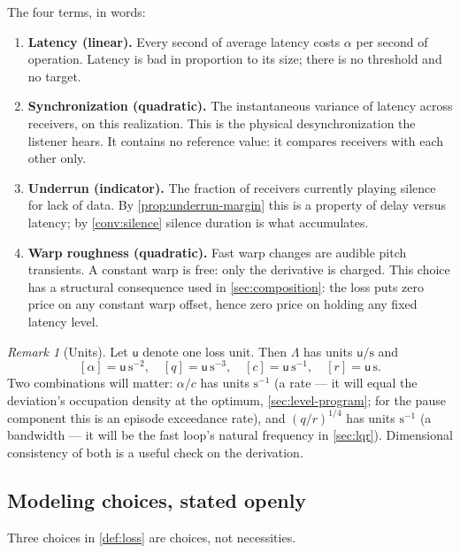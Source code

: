 \documentclass[11pt, a4paper]{article}
\theoremstyle{definition}
\theoremstyle{plain}
\theoremstyle{remark}
\newtheorem{remark}{Remark}[section]
\begin{document}
The four terms, in words:
\begin{enumerate}[label=(\roman*)]
  \item \textbf{Latency (linear).}  Every second of average latency costs
    $\alpha$ per second of operation.  Latency is bad in proportion to its
    size; there is no threshold and no target.
  \item \textbf{Synchronization (quadratic).}  The instantaneous variance
    of latency across receivers, on this realization.  This is the
    physical desynchronization the listener hears.  It contains no
    reference value: it compares receivers with each other only.
  \item \textbf{Underrun (indicator).}  The fraction of receivers
    currently playing silence for lack of data.  By
    \cref{prop:underrun-margin} this is a property of delay versus
    latency; by \cref{conv:silence} silence duration is what accumulates.
  \item \textbf{Warp roughness (quadratic).}  Fast warp changes are
    audible pitch transients.  A constant warp is free: only the
    derivative is charged.  This choice has a structural consequence used
    in \cref{sec:composition}: the loss puts zero price on any constant
    warp offset, hence zero price on holding any fixed latency level.
\end{enumerate}

\begin{remark}[Units]\label{rem:units}
Let $\mathsf{u}$ denote one loss unit.  Then $\Lambda$ has units
$\mathsf{u}/\mathrm{s}$ and
\[
  [\alpha] = \mathsf{u}\,\mathrm{s}^{-2},\quad
  [q] = \mathsf{u}\,\mathrm{s}^{-3},\quad
  [c] = \mathsf{u}\,\mathrm{s}^{-1},\quad
  [r] = \mathsf{u}\,\mathrm{s}.
\]
Two combinations will matter:
$\alpha/c$ has units $\mathrm{s}^{-1}$ (a rate --- it will equal the
deviation's occupation density at the optimum,
\cref{sec:level-program}; for the pause component this is an episode
exceedance rate), and $(q/r)^{1/4}$ has units
$\mathrm{s}^{-1}$ (a bandwidth --- it will be the fast loop's natural
frequency in \cref{sec:lqr}).  Dimensional consistency of both is a
useful check on the derivation.
\end{remark}

\subsection{Modeling choices, stated openly}\label{sec:modeling-choices}

Three choices in \cref{def:loss} are choices, not necessities.
\end{document}
